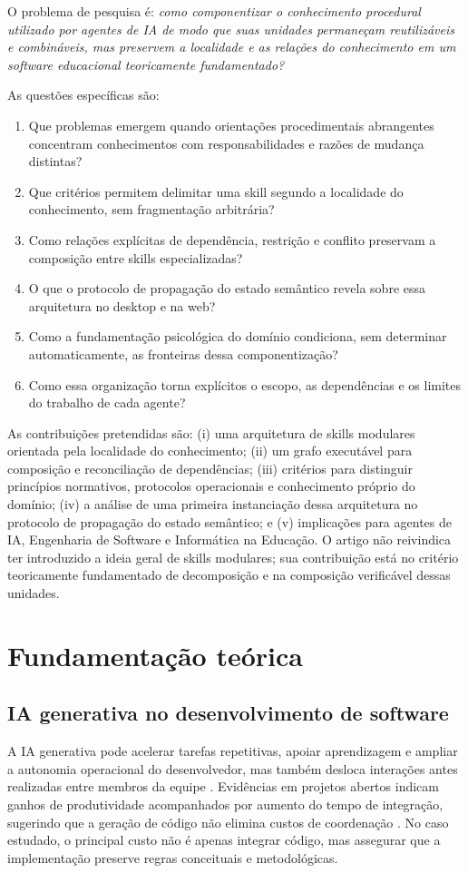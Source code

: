 \documentclass[preprint,12pt,authoryear]{elsarticle}
\begin{document}
O problema de pesquisa é: \emph{como componentizar o conhecimento procedural utilizado por agentes de IA de modo que suas unidades permaneçam reutilizáveis e combináveis, mas preservem a localidade e as relações do conhecimento em um software educacional teoricamente fundamentado?}

As questões específicas são:
\begin{enumerate}[label=QP\arabic*.]
  \item Que problemas emergem quando orientações procedimentais abrangentes concentram conhecimentos com responsabilidades e razões de mudança distintas?
  \item Que critérios permitem delimitar uma skill segundo a localidade do conhecimento, sem fragmentação arbitrária?
  \item Como relações explícitas de dependência, restrição e conflito preservam a composição entre skills especializadas?
  \item O que o protocolo de propagação do estado semântico revela sobre essa arquitetura no desktop e na web?
  \item Como a fundamentação psicológica do domínio condiciona, sem determinar automaticamente, as fronteiras dessa componentização?
  \item Como essa organização torna explícitos o escopo, as dependências e os limites do trabalho de cada agente?
\end{enumerate}

As contribuições pretendidas são: (i) uma arquitetura de skills modulares orientada pela localidade do conhecimento; (ii) um grafo executável para composição e reconciliação de dependências; (iii) critérios para distinguir princípios normativos, protocolos operacionais e conhecimento próprio do domínio; (iv) a análise de uma primeira instanciação dessa arquitetura no protocolo de propagação do estado semântico; e (v) implicações para agentes de IA, Engenharia de Software e Informática na Educação. O artigo não reivindica ter introduzido a ideia geral de skills modulares; sua contribuição está no critério teoricamente fundamentado de decomposição e na composição verificável dessas unidades.

\section{Fundamentação teórica}
\subsection{IA generativa no desenvolvimento de software}
A IA generativa pode acelerar tarefas repetitivas, apoiar aprendizagem e ampliar a autonomia operacional do desenvolvedor, mas também desloca interações antes realizadas entre membros da equipe \citep{ulfsnes2024transforming}. Evidências em projetos abertos indicam ganhos de produtividade acompanhados por aumento do tempo de integração, sugerindo que a geração de código não elimina custos de coordenação \citep{song2024impact}. No caso estudado, o principal custo não é apenas integrar código, mas assegurar que a implementação preserve regras conceituais e metodológicas.
\end{document}
